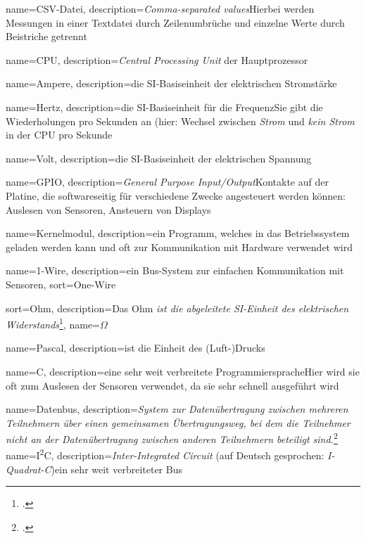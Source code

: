 {
  name=CSV-Datei,
  description={\textit{Comma-separated values}\newline Hierbei werden Messungen in einer Textdatei durch Zeilenumbrüche und einzelne Werte durch Beistriche getrennt}
}

{
  name=CPU,
  description={\textit{Central Processing Unit}\newline
  	der Hauptprozessor}
}

{
  name=Ampere,
  description={die SI-Basiseinheit der elektrischen Stromstärke}
}

{
  name=Hertz,
  description={die SI-Basiseinheit für die Frequenz\newline Sie gibt die Wiederholungen pro Sekunden an (hier: Wechsel zwischen \emph{Strom} und \emph{kein Strom} in der \gls{CPU} pro Sekunde}
}

{
  name=Volt,
  description={die SI-Basiseinheit der elektrischen Spannung}
}

{
  name=GPIO,
  description={\emph{General Purpose Input/Output}\newline Kontakte auf der \gls{Platine}, die softwareseitig für verschiedene Zwecke angesteuert werden können\newline \zB: Auslesen von Sensoren, Ansteuern von Displays}
}

{
  name=Kernelmodul,
  description={ein Programm, welches in das Betriebssystem geladen werden kann und oft zur Kommunikation mit Hardware verwendet wird}
}

{
  name=1-Wire,
  description={ein \gls{Bus}-System zur einfachen Kommunikation mit Sensoren},
  sort=One-Wire
}

{
  sort=Ohm,
  description={Das Ohm \emph{ist die abgeleitete SI-Einheit des elektrischen Widerstands}\footcite{wiki:ohm}},
  name={\ensuremath{\Omega}}
}

{
  name=Pascal,
  description={ist die Einheit des (Luft-)Drucks}
}


{
  name=C,
  description={eine sehr weit verbreitete Programmiersprache\newline Hier wird sie oft zum Auslesen der Sensoren verwendet, da sie sehr schnell ausgeführt wird}
}

{
  name=Datenbus,
  description={\emph{System zur Datenübertragung zwischen mehreren Teilnehmern über einen gemeinsamen Übertragungsweg, bei dem die Teilnehmer nicht an der Datenübertragung zwischen anderen Teilnehmern beteiligt sind.}\footcite{wiki:bus}}
}
{
  name=I\textsuperscript{2}C,
  description={\textit{Inter-Integrated Circuit} (auf Deutsch gesprochen: \textit{I-Quadrat-C})\newline ein sehr weit verbreiteter \gls{Bus}}
}

